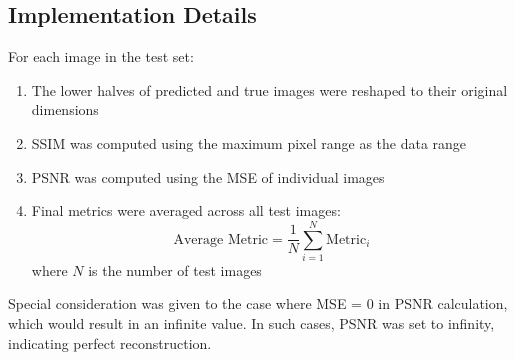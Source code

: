 \documentclass{article}
\begin{document}
        \subsection{Implementation Details}
        For each image in the test set:
        \begin{enumerate}
            \item The lower halves of predicted and true images were reshaped to their original dimensions
            \item SSIM was computed using the maximum pixel range as the data range
            \item PSNR was computed using the MSE of individual images
            \item Final metrics were averaged across all test images:
            \begin{equation}
                \text{Average Metric} = \frac{1}{N}\sum_{i=1}^{N} \text{Metric}_i
            \end{equation}
            where $N$ is the number of test images
        \end{enumerate}
    
        Special consideration was given to the case where MSE = 0 in PSNR calculation, which would result in an infinite value. In such cases, PSNR was set to infinity, indicating perfect reconstruction.
\end{document}
